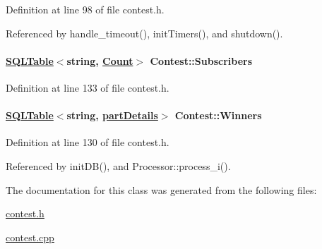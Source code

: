 Definition at line 98 of file contest.h.

Referenced by handle\_\-timeout(), init\-Timers(), and shutdown().\hypertarget{classContest_Contestm10}{
\paragraph[Subscribers]{\setlength{\rightskip}{0pt plus 5cm}\hyperlink{classSQLTable}{SQLTable}$<$string, \hyperlink{classCount}{Count}$>$ Contest::Subscribers}\hfill}
\label{classContest_Contestm10}




Definition at line 133 of file contest.h.\hypertarget{classContest_Contestm9}{
\paragraph[Winners]{\setlength{\rightskip}{0pt plus 5cm}\hyperlink{classSQLTable}{SQLTable}$<$string, \hyperlink{classpartDetails}{part\-Details}$>$ Contest::Winners}\hfill}
\label{classContest_Contestm9}




Definition at line 130 of file contest.h.

Referenced by init\-DB(), and Processor::process\_\-i().

The documentation for this class was generated from the following files:\begin{CompactItemize}
\item 
\hyperlink{contest_8h}{contest.h}\item 
\hyperlink{contest_8cpp}{contest.cpp}\end{CompactItemize}
